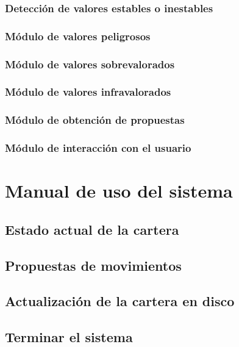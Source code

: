 \documentclass[a4paper, 11pt, titlepage]{article}
\theoremstyle{definition}
\begin{document}
  \subsubsection*{Detección de valores estables o inestables}
  \subsubsection{Módulo de valores peligrosos}
  \subsubsection{Módulo de valores sobrevalorados}
  \subsubsection{Módulo de valores infravalorados}
  \subsubsection{Módulo de obtención de propuestas}
  \subsubsection{Módulo de interacción con el usuario}
  \section{Manual de uso del sistema}
  \subsection{Estado actual de la cartera}
  \subsection{Propuestas de movimientos}
  \subsection{Actualización de la cartera en disco}
  \subsection{Terminar el sistema}
\end{document}
